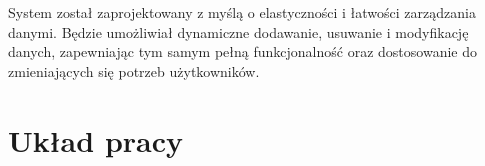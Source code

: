 System został zaprojektowany z myślą o elastyczności i łatwości zarządzania danymi. Będzie umożliwiał dynamiczne dodawanie, usuwanie i modyfikację danych, zapewniając tym samym pełną funkcjonalność oraz dostosowanie do zmieniających się potrzeb użytkowników.


\section{Układ pracy}


